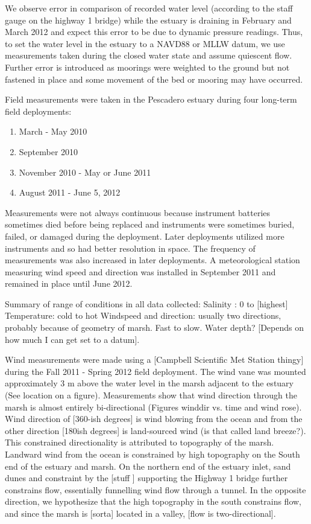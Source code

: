We observe error in comparison of recorded water level (according to the
staff gauge on the highway 1 bridge) while the estuary is draining in
February and March 2012 and expect this error to be due to dynamic
pressure readings. Thus, to set the water level in the estuary to a
NAVD88 or MLLW datum, we use measurements taken during the closed water
state and assume quiescent flow.  Further error is introduced as
moorings were weighted to the ground but not fastened in place and some
movement of the bed or mooring may have occurred.

Field measurements were taken in the Pescadero estuary during four long-term field
deployments:

\begin{enumerate}
	\item March - May 2010 
	\item September 2010 
	\item November 2010 - May or June 2011 
	\item August 2011 - June 5, 2012
\end{enumerate}

 Measurements were not always continuous because instrument batteries sometimes died before being replaced and 
instruments were sometimes buried, failed, or damaged during the deployment. Later deployments utilized more instruments 
and so had better resolution in space.  The frequency of measurements was also increased
in later deployments. A meteorological station measuring wind speed and direction was
installed in September 2011 and remained in place until June 2012.

Summary of range of conditions in all data collected: Salinity : 0 to
[highest] Temperature: cold to hot Windspeed and direction: usually two
directions, probably because of geometry of marsh. Fast to slow. Water
depth? [Depends on how much I can get set to a datum].


Wind measurements were made using a [Campbell Scientific Met Station
thingy] during the Fall 2011 - Spring 2012 field deployment. The wind
vane was mounted approximately 3 m above the water level in the marsh
adjacent to the estuary (See location on a figure).  Measurements show
that wind direction through the marsh is almost entirely bi-directional
(Figures winddir vs. time and wind rose). Wind direction of [360-ish
degrees] is wind blowing from the ocean and from the other direction
[180ish degrees] is land-sourced wind (is that called land breeze?).
This constrained directionality is attributed to topography of the
marsh.  Landward wind from the ocean is constrained by high topography
on the South end of the estuary and marsh. On the northern end of the
estuary inlet, sand dunes and constraint by the [stuff ] supporting the
Highway 1 bridge further constrains flow, essentially funnelling wind
flow through a tunnel.  In the opposite direction, we hypothesize that
the high topography in the south constrains flow, and since the marsh is
[sorta] located in a valley, [flow is two-directional].


